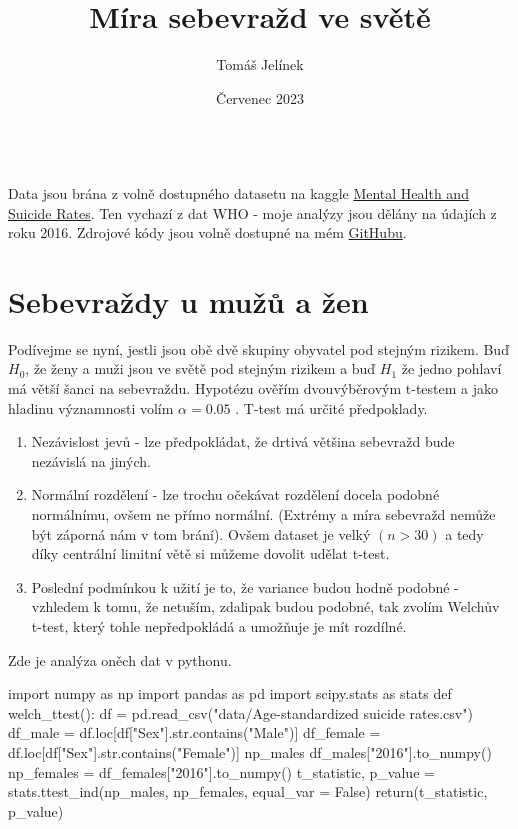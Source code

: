 \documentclass[12pt]{article}
\title{Míra sebevražd ve světě}
\author{Tomáš Jelínek}
\date{Červenec 2023}
\begin{document}
\maketitle
{}\\

Data jsou brána z volně dostupného datasetu na kaggle \href{https://www.kaggle.com/datasets/twinkle0705/mental-health-and-suicide-rates?select=Facilities.csv}{Mental Health and Suicide Rates}. Ten vychazí z dat WHO - moje analýzy jsou dělány na údajích z roku 2016. Zdrojové kódy jsou volně dostupné na mém \href{https://github.com/Desperadus/PaST-Zapoctak}{GitHubu}.

\section{Sebevraždy u mužů a žen}
Podívejme se nyní, jestli jsou obě dvě skupiny obyvatel pod stejným rizikem. Buď $H_0$, že ženy a muži jsou ve světě pod stejným rizikem a buď $H_1$ že jedno pohlaví má větší šanci na sebevraždu. Hypotézu ověřím dvouvýběrovým t-testem a jako hladinu významnosti volím $\alpha = 0.05$ . T-test má určité předpoklady.
\begin{enumerate}
\item Nezávislost jevů - lze předpokládat, že drtivá většina sebevražd bude nezávislá na jiných.
\item Normální rozdělení - lze trochu očekávat rozdělení docela podobné normálnímu, ovšem ne přímo normální. (Extrémy a míra sebevražd nemůže být záporná nám v tom brání). Ovšem dataset je velký $(n > 30)$ a tedy díky centrální limitní větě si můžeme dovolit udělat t-test.
\item Poslední podmínkou k užití je to, že variance budou hodně podobné - vzhledem k tomu, že netuším, zdalipak budou podobné, tak zvolím Welchův t-test, který tohle nepředpokládá a umožňuje je mít rozdílné.
\end{enumerate}

\newpage
Zde je analýza oněch dat v pythonu.
\begin{python}
import numpy as np
import pandas as pd
import scipy.stats as stats
def welch_ttest():
		df = pd.read_csv("data/Age-standardized suicide rates.csv")
    df_male = df.loc[df["Sex"].str.contains("Male")]
    df_female = df.loc[df["Sex"].str.contains("Female")]
    np_males df_males["2016"].to_numpy()
    np_females = df_females["2016"].to_numpy()
    t_statistic, p_value = stats.ttest_ind(np_males, np_females, equal_var = False)
    return(t_statistic, p_value)
\end{python}
\end{document}
